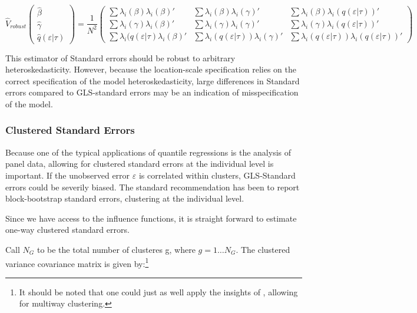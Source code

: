 \documentclass[
  authoryear,
  preprint,
  1p]{elsarticle}
\begin{document}
\[\hat{V}_{robust}
  \begin{pmatrix}
  \hat\beta \\
  \hat\gamma \\
  \hat q(\varepsilon|\tau)
  \end{pmatrix}
 = \frac{1}{N^2} 
 \begin{pmatrix}
 \sum \lambda_i(\beta) \lambda_i(\beta)' & \sum \lambda_i(\beta) \lambda_i(\gamma)' & \sum \lambda_i(\beta) \lambda_i(q(\varepsilon|\tau))' \\
 \sum \lambda_i(\gamma) \lambda_i(\beta)' & \sum \lambda_i(\gamma) \lambda_i(\gamma)' & \sum \lambda_i(\gamma) \lambda_i(q(\varepsilon|\tau))' \\
 \sum \lambda_i(q(\varepsilon|\tau) \lambda_i(\beta)' & \sum \lambda_i(q(\varepsilon|\tau))\lambda_i(\gamma)' & \sum \lambda_i(q(\varepsilon|\tau)) \lambda_i(q(\varepsilon|\tau))' 
  \end{pmatrix}
\]

This estimator of Standard errors should be robust to arbitrary
heteroskedasticity. However, because the location-scale specification
relies on the correct specification of the model heteroskedasticity,
large differences in Standard errors compared to GLS-standard errors may
be an indication of misspecification of the model.

\hypertarget{clustered-standard-errors}{%
\subsubsection{Clustered Standard
Errors}\label{clustered-standard-errors}}

Because one of the typical applications of quantile regressions is the
analysis of panel data, allowing for clustered standard errors at the
individual level is important. If the unobserved error \(\varepsilon\)
is correlated within clusters, GLS-Standard errors could be severily
biased. The standard recommendation has been to report block-bootstrap
standard errors, clustering at the individual level.

Since we have access to the influence functions, it is straight forward
to estimate one-way clustered standard errors.

Call \(N_G\) to be the total number of clusteres g, where
\(g=1\dots N_G\). The clustered variance covariance matrix is given
by:\footnote{It should be noted that one could just as well apply the
  insights of \citet{cameron_robust_2011}, allowing for multiway
  clustering.}
\end{document}
